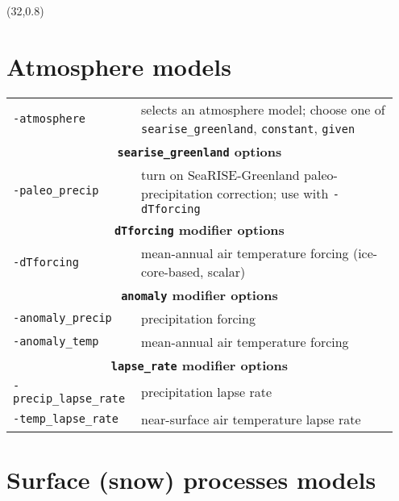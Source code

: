 \documentclass[landscape]{article}
\newcommand{\tabletitle}[1]{\multicolumn{2}{c}{\textbf{#1}}}
\begin{document}
\begin{textblock}{15}(32,0.8)


\section{Atmosphere models}
\label{sec:atmosphere-models}

\begin{tabular}{@{}p{0.3\linewidth}p{0.65\linewidth}@{}}
\texttt{-atmosphere} & selects an atmosphere model; choose one of
\mbox{\texttt{searise_greenland}}, \texttt{constant},
\mbox{\texttt{given}}\\
\tabletitle{\texttt{searise_greenland} options}\\
\texttt{-paleo_precip} & turn on SeaRISE-Greenland paleo-precipitation
correction; use with \texttt{-dTforcing}\\
\tabletitle{\texttt{dTforcing} modifier options} \\
\texttt{-dTforcing} & mean-annual air temperature forcing (ice-core-based,
scalar)\\
\tabletitle{\texttt{anomaly} modifier options}\\
\texttt{-anomaly_precip} & precipitation forcing\\
\texttt{-anomaly_temp} & mean-annual air temperature forcing\\
\tabletitle{\texttt{lapse_rate} modifier options}\\
\texttt{-precip_lapse_rate} & precipitation lapse rate\\
\texttt{-temp_lapse_rate} & near-surface air temperature lapse rate
\end{tabular}

\section{Surface (snow) processes models}
\label{sec:surface-models}


\end{textblock}
\end{document}
